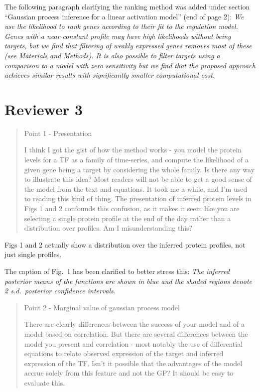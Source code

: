 \documentclass{article}
\begin{document}
The following paragraph clarifying the ranking method was added
under section ``Gaussian process inference for a linear activation
model'' (end of page 2):
\emph{We use the likelihood to rank genes according to their fit to the
regulation model. Genes with a
near-constant profile may have high likelihoods without being targets,
but we find that filtering of weakly expressed genes removes most of
these (see Materials and Methods). It is also possible to filter
targets using a comparison to a model with
zero sensitivity but we find that the proposed approach achieves
similar results with significantly smaller computational cost.}


\newpage

\section*{Reviewer 3}

\begin{quote}
Point 1 - Presentation 

I think I got the gist of how the method works - you model the protein
levels for a TF as a family of time-series, and compute the likelihood
of a given gene being a target by considering the whole family. Is
there any way to illustrate this idea? Most readers will not be able
to get a good sense of the model from the text and equations. It took
me a while, and I'm used to reading this kind of thing. The
presentation of inferred protein levels in Figs 1 and 2 confounds this
confusion, as it makes it seem like you are selecting a single protein
profile at the end of the day rather than a distribution over
profiles. Am I misunderstanding this?
\end{quote}

Figs 1 and 2 actually show a distribution over the inferred protein
profiles, not just single profiles.

The caption of Fig.~1 has been clarified to better stress this:
\emph{The inferred posterior means of the functions are shown in blue
  and the shaded regions denote 2 s.d.\ posterior confidence
  intervals.}

\begin{quote}
Point 2 - Marginal value of gaussian process model 

There are clearly differences between the success of your model and of
a model based on correlation. But there are several differences
between the model you present and correlation - most notably the use
of differential equations to relate observed expression of the target
and inferred expression of the TF. Isn't it possible that the
advantages of the model accrue solely from this feature and not the
GP? It should be easy to evaluate this.
\end{quote}
\end{document}
